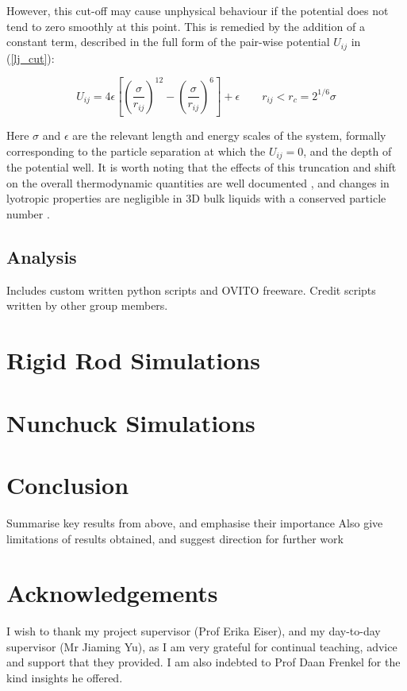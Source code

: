 \documentclass[11pt, a4paper]{article} %
\begin{document}
However, this cut-off may cause unphysical behaviour if the potential does not tend to zero smoothly at this point. This is remedied by the addition of a constant term, described in the full form of the pair-wise potential $U_{ij}$ in (\ref{lj_cut}):

\begin{equation} \label{lj_cut}
U_{ij} = 4\epsilon \left[ \left( \frac{\sigma}{r_{ij}} \right) ^{12} - \left( \frac{\sigma}{r_{ij}} \right) ^{6}	\right] + \epsilon \qquad	 r_{ij} < r_{c} = 2^{1/6} \sigma
\end{equation}

Here $\sigma$ and $\epsilon$ are the relevant length and energy scales of the system, formally corresponding to the particle separation at which the $U_{ij} = 0$, and the depth of the potential well. It is worth noting that the effects of this truncation and shift on the overall thermodynamic quantities are well documented \cite{Stephan2020, Shaul2010}, and changes in lyotropic properties are negligible in 3D bulk liquids with a conserved particle number \cite{Smit1991}. 


 
\subsection{Analysis}
Includes custom written python scripts and OVITO freeware. Credit scripts written by other group members.

\section{Rigid Rod Simulations}


\section{Nunchuck Simulations}



\section{Conclusion}
Summarise key results from above, and emphasise their importance 
Also give limitations of results obtained, and suggest direction for further work

\section*{Acknowledgements}
I wish to thank my project supervisor (Prof Erika Eiser), and my day-to-day supervisor (Mr Jiaming Yu), as I am very grateful for continual teaching, advice and support that they provided. I am also indebted to Prof Daan Frenkel for the kind insights he offered.
\end{document}
